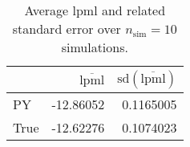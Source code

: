 \begin{table}[H]

\caption{Average lpml and related standard error over $n_{\text{sim}} = 10$ simulations.}
\centering
\begin{tabular}[t]{lrr}
\toprule
  & $\overbar{\text{lpml}}$ & $\text{sd}(\overbar{\text{lpml}})$\\
\midrule
PY & -12.86052 & 0.1165005\\
True & -12.62276 & 0.1074023\\
\bottomrule
\end{tabular}
\end{table}